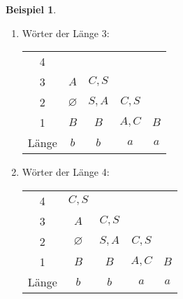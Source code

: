 \documentclass[11pt]{article} %
\theoremstyle{definition}
\newtheorem*{beispiel}{Beispiel}
\newtheorem*{bemerkung}{Bemerkung}
\begin{document}
\begin{beispiel}
\begin{enumerate}
\begin{itemize}
\end{itemize}

\begin{center}
\begin{tabular}{ccccc}
\toprule
4     &       &       &       &  \\
3     &       &       &       &  \\
2     & $\varnothing$ & $S,A$ & $C,S$ &  \\
1     & $B$   & $B$   & $A,C$ & $B$ \\
\midrule
Länge & $b$   & $b$   & $a$   & $a$ \\
\bottomrule
\end{tabular}%
\end{center}

\begin{bemerkung}[Allgemeine Regel für längere Teilwörter]
Für alle $i,j \in \{1,\dots, n\}$ mit $i<j$ ist
\begin{eqnarray*}
V(i,j) &=& \{X \in N | \textrm{ es existiert ein $k$ mit $i \le k < j$, } \\
&& \textrm {so dass $X \rightarrow YZ\in P$ mit $Y \in V(i,j)$ und } Z\in V(k,j)\}
\end{eqnarray*}

Beispielsweise lässt sich $bba$ aufteilen als $b|ba \textrm{ } (k = 1)$ oder $bb|a \textrm{ } (k=2)$.
\end{bemerkung}

\item Wörter der Länge 3:

\begin{center}
\begin{tabular}{ccccc}
\toprule
4     &       &       &       &  \\
3     & $A$   & $C,S$ &       &  \\
2     & $\varnothing$ & $S,A$ & $C,S$ &  \\
1     & $B$   & $B$   & $A,C$ & $B$ \\
\midrule
Länge & $b$   & $b$   & $a$   & $a$ \\
\bottomrule
\end{tabular}%
\end{center}
\item Wörter der Länge 4:

\begin{center}
\begin{tabular}{ccccc}
\toprule
4     & $C,S$ &       &       &  \\
3     & $A$   & $C,S$ &       &  \\
2     & $\varnothing$ & $S,A$ & $C,S$ &  \\
1     & $B$   & $B$   & $A,C$ & $B$ \\
\midrule
Länge & $b$   & $b$   & $a$   & $a$ \\
\bottomrule
\end{tabular}%
\end{center}



\end{enumerate}
\end{beispiel}
\end{document}
